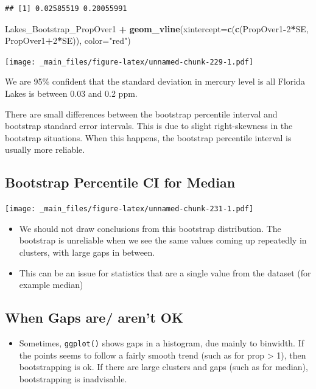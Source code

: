 \documentclass[]{book}
\newenvironment{Shaded}{\begin{snugshade}}{\end{snugshade}}
\newcommand{\KeywordTok}[1]{\textcolor[rgb]{0.13,0.29,0.53}{\textbf{#1}}}
\newcommand{\DataTypeTok}[1]{\textcolor[rgb]{0.13,0.29,0.53}{#1}}
\newcommand{\DecValTok}[1]{\textcolor[rgb]{0.00,0.00,0.81}{#1}}
\newcommand{\StringTok}[1]{\textcolor[rgb]{0.31,0.60,0.02}{#1}}
\newcommand{\OperatorTok}[1]{\textcolor[rgb]{0.81,0.36,0.00}{\textbf{#1}}}
\newcommand{\NormalTok}[1]{#1}
\providecommand{\tightlist}{%
  \setlength{\itemsep}{0pt}\setlength{\parskip}{0pt}}
\begin{document}
\begin{verbatim}
## [1] 0.02585519 0.20055991
\end{verbatim}

\begin{Shaded}
\begin{Highlighting}[]
\NormalTok{Lakes_Bootstrap_PropOver1  }\OperatorTok{+}\StringTok{ }\KeywordTok{geom_vline}\NormalTok{(}\DataTypeTok{xintercept=}\KeywordTok{c}\NormalTok{(}\KeywordTok{c}\NormalTok{(PropOver1}\OperatorTok{-}\DecValTok{2}\OperatorTok{*}\NormalTok{SE, PropOver1}\OperatorTok{+}\DecValTok{2}\OperatorTok{*}\NormalTok{SE)), }\DataTypeTok{color=}\StringTok{"red"}\NormalTok{) }
\end{Highlighting}
\end{Shaded}

\texttt{[image: \_main\_files/figure-latex/unnamed-chunk-229-1.pdf]}

We are 95\% confident that the standard deviation in mercury level is
all Florida Lakes is between 0.03 and 0.2 ppm.

There are small differences between the bootstrap percentile interval
and bootstrap standard error intervals. This is due to slight
right-skewness in the bootstrap situations. When this happens, the
bootstrap percentile interval is usually more reliable.

\subsection{Bootstrap Percentile CI for
Median}\label{bootstrap-percentile-ci-for-median}

\texttt{[image: \_main\_files/figure-latex/unnamed-chunk-231-1.pdf]}

\begin{itemize}
\item
  We should not draw conclusions from this bootstrap distribution. The
  bootstrap is unreliable when we see the same values coming up
  repeatedly in clusters, with large gaps in between.
\item
  This can be an issue for statistics that are a single value from the
  dataset (for example median)
\end{itemize}

\subsection{When Gaps are/ aren't OK}\label{when-gaps-are-arent-ok}

\begin{itemize}
\tightlist
\item
  Sometimes, \texttt{ggplot()} shows gaps in a histogram, due mainly to
  binwidth. If the points seems to follow a fairly smooth trend (such as
  for prop \textgreater{} 1), then bootstrapping is ok. If there are
  large clusters and gaps (such as for median), bootstrapping is
  inadvisable.
\end{itemize}
\end{document}
